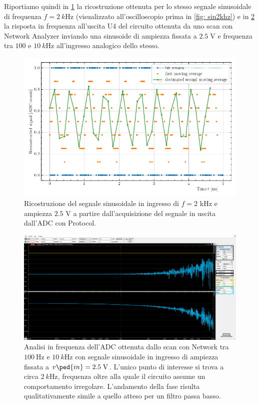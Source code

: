 \documentclass[10pt, a4paper, italian]{article}
\begin{document}
Riportiamo quindi in \cref{fig: sin2khzpy} la ricostruzione ottenuta per lo
stesso segnale sinusoidale di frequenza $f = \SI{2}{k\Hz}$ (visualizzato
all'oscilloscopio prima in \cref{fig: sin2khz}) e in \cref{fig: net}
la risposta in frequenza all'uscita U4 del circuito ottenuta da uno scan con
Network Analyzer inviando una sinusoide di ampiezza fissata a $2.5 \; \si{\V}$
e frequenza tra $100$ e $\SI{10}{k\Hz}$ all'ingresso analogico dello stesso.
\begin{figure}[htbp]
    \centering
	\includegraphics[width=\textwidth]{sin2khzpy}
    \caption{Ricostruzione del segnale sinusoidale in ingresso di $f = 2$
    kHz e ampiezza $2.5$ V a partire dall'acquisizione del segnale in uscita
    dall'ADC con Protocol.
    \label{fig: sin2khzpy}}
\end{figure}
\begin{figure}[htbp]
	\centering
	\includegraphics[width=\textwidth]{Net100-10k}
	\caption{Analisi in frequenza dell'ADC ottenuta dallo scan con Network
	tra $\SI{100}{\Hz}$ e $\SI{10}{k\Hz}$ con segnale sinusoidale in ingresso
	di ampiezza fissata a $v\ped{in} = 2.5 \; \si{\V}$. L'unico punto di
	interesse si trova a circa $\SI{2}{k\Hz}$, frequenza oltre alla quale il
	circuito assume un comportamento irregolare. L'andamento della fase risulta
	qualitativamente simile a quello atteso per un filtro passa basso.
	\label{fig: net}}
\end{figure}
\end{document}
